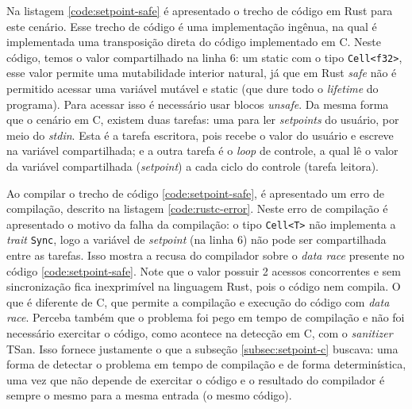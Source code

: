 Na listagem \ref{code:setpoint-safe} é apresentado o trecho de código em Rust para este cenário. Esse trecho de código é uma implementação ingênua, na qual é implementada uma transposição direta do código implementado em C. Neste código, temos o valor compartilhado na linha 6: um static com o tipo \texttt{Cell<f32>}, esse valor permite uma mutabilidade interior natural, já que em Rust \textit{safe} não é permitido acessar uma variável mutável e static (que dure todo o \textit{lifetime} do programa). Para acessar isso é necessário usar blocos \textit{unsafe}. Da mesma forma que o cenário em C, existem duas tarefas: uma para ler \textit{setpoints} do usuário, por meio do \textit{stdin}. Esta é a tarefa escritora, pois recebe o valor do usuário e escreve na variável compartilhada; e a outra tarefa é o \textit{loop} de controle, a qual lê o valor da variável compartilhada (\textit{setpoint}) a cada ciclo do controle (tarefa leitora).


Ao compilar o trecho de código \ref{code:setpoint-safe}, é apresentado um erro de compilação, descrito na listagem \ref{code:rustc-error}. Neste erro de compilação é apresentado o motivo da falha da compilação: o tipo \texttt{Cell<T>} não implementa a \textit{trait} \texttt{Sync}, logo a variável de \textit{setpoint} (na linha 6) não pode ser compartilhada entre as tarefas. Isso mostra a recusa do compilador sobre o \textit{data race} presente no código \ref{code:setpoint-safe}. Note que o valor possuir 2 acessos concorrentes e sem sincronização fica inexprimível na linguagem Rust, pois o código nem compila. O que é diferente de C, que permite a compilação e execução do código com \textit{data race}. Perceba também que o problema foi pego em tempo de compilação e não foi necessário exercitar o código, como acontece na detecção em C, com o \textit{sanitizer} \ac{TSan}. Isso fornece justamente o que a subseção \ref{subsec:setpoint-c} buscava: uma forma de detectar o problema em tempo de compilação e de forma determinística, uma vez que não depende de exercitar o código e o resultado do compilador é sempre o mesmo para a mesma entrada (o mesmo código).

